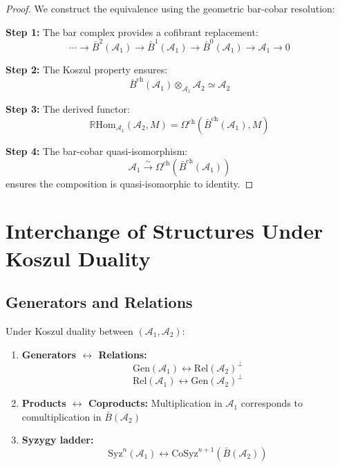 \begin{proof}
We construct the equivalence using the geometric bar-cobar resolution:

\textbf{Step 1:} The bar complex provides a cofibrant replacement:
$$\cdots \to \bar{B}^2(\mathcal{A}_1) \to \bar{B}^1(\mathcal{A}_1) \to \bar{B}^0(\mathcal{A}_1) \to \mathcal{A}_1 \to 0$$

\textbf{Step 2:} The Koszul property ensures:
$$\bar{B}^{\text{ch}}(\mathcal{A}_1) \otimes_{\mathcal{A}_1} \mathcal{A}_2 \simeq \mathcal{A}_2$$

\textbf{Step 3:} The derived functor:
$$\mathbb{R}\text{Hom}_{\mathcal{A}_1}(\mathcal{A}_2, M) = \Omega^{\text{ch}}(\bar{B}^{\text{ch}}(\mathcal{A}_1), M)$$

\textbf{Step 4:} The bar-cobar quasi-isomorphism:
$$\mathcal{A}_1 \xrightarrow{\sim} \Omega^{\text{ch}}(\bar{B}^{\text{ch}}(\mathcal{A}_1))$$
ensures the composition is quasi-isomorphic to identity.
\end{proof}


\section{Interchange of Structures Under Koszul Duality}

\subsection{Generators and Relations}

\begin{theorem}
Under Koszul duality between $(\mathcal{A}_1, \mathcal{A}_2)$:
\begin{enumerate}
\item \textbf{Generators $\leftrightarrow$ Relations:}
$$\text{Gen}(\mathcal{A}_1) \leftrightarrow \text{Rel}(\mathcal{A}_2)^{\perp}$$
$$\text{Rel}(\mathcal{A}_1) \leftrightarrow \text{Gen}(\mathcal{A}_2)^{\perp}$$

\item \textbf{Products $\leftrightarrow$ Coproducts:}
Multiplication in $\mathcal{A}_1$ corresponds to comultiplication in $\bar{B}(\mathcal{A}_2)$

\item \textbf{Syzygy ladder:}
$$\text{Syz}^n(\mathcal{A}_1) \leftrightarrow \text{CoSyz}^{n+1}(\bar{B}(\mathcal{A}_2))$$
\end{enumerate}
\end{theorem}

